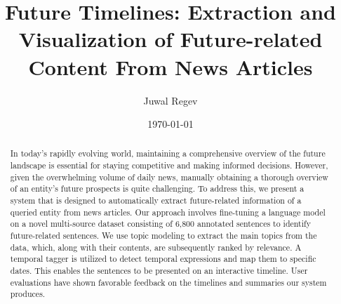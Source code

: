 \documentclass[a4paper,10pt]{report} %
\title{Future Timelines: Extraction and Visualization of Future-related Content From News Articles}
\author{Juwal Regev}
\date{\today} %
\begin{document}
\maketitle

\begin{abstract}
In today’s rapidly evolving world, maintaining a comprehensive overview of the future landscape is essential for staying competitive and making informed decisions. However, given the overwhelming volume of daily news, manually obtaining a thorough overview of an entity’s future prospects is quite challenging. To address this, we present a system that is designed to automatically extract future-related information of a queried entity from news articles. Our approach involves fine-tuning a language model on a novel multi-source dataset consisting of 6,800 annotated sentences to identify future-related sentences. We use topic modeling to extract the main topics from the data, which, along with their contents, are subsequently ranked by relevance. A temporal tagger is utilized to detect temporal expressions and map them to specific dates. This enables the sentences to be presented on an interactive timeline. User evaluations have shown favorable feedback on the timelines and summaries our system produces.
\end{abstract}

\tableofcontents

\end{document}
